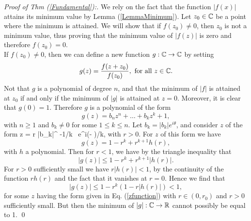 \begin{proof}[Proof of Thm (\ref{Fundamental}):]
We rely on the fact that the function $|f(x)|$ attains its minimum value by Lemma (\ref{LemmaMinimum}). Let $z_0 \in \mathbb{C}$ be a point where the minimum is attained. We will show that if $f(z_0) \ne 0$, then $z_0$ is not a minimum value, thus proving that the minimum value of $|f(z)|$ is zero and therefore $f(z_0) = 0$. \\

If $f(z_0) \ne 0$, then we can define a new function $g : \mathbb{C} \rightarrow \mathbb{C}$ by setting
\[ g(z) = {f(z+ z_0)\over f(z_0)}, \mbox{ for all } z \in \mathbb{C}. \]
Not that $g$ is a polynomial of degree $n$, and that the minimum of $|f|$ is attained at $z_0$ if and only if the minimum of $| g |$ is attained at $z=0$. Moreover, it is clear that $g(0) = 1$. 
Therefore $g$ is a polynomial of the form 
\[ g(z) = b_n z^n + \hdots + b_k z^k + 1,\] with $n\ge 1$ and $b_k \ne 0$ for some $1\le k \le n$. Let $b_k = |b_k| e^{i\theta}$, and consider $z$ of the form 
\be z = r |b_k|^ {-1/k} \, e^{i(\pi - \theta)/k}, \label{zfunction}\ee
with $r > 0$. For $z$ of this form we have 
\[ g(z) = 1 - r^k + r^{k+1} h(r),\] with $h$ a polynomial. Then for $r<1$, we have by the triangle inequality that 
\[ |g(z) | \le 1 - r^k + r^{k+1}| h(r) |.\]
For $r>0$ sufficiently small we have $r | h(r) | < 1$, by the continuity of the function $r h(r)$ and the fact that it vanishes at $r=0$. Hence we find that
\[ | g(z) | \le 1 - r^k(1- r|h(r)|) < 1,\] for some $z$ having the form given in Eq. (\ref{zfunction}) with $ r \in (0, r_0)$ and $r>0$ sufficiently small.  But then the minimum of $|g| : \mathbb{C} \rightarrow \mathbb{R}$ cannot possibly be equal to 1. \qed 
\end{proof}

